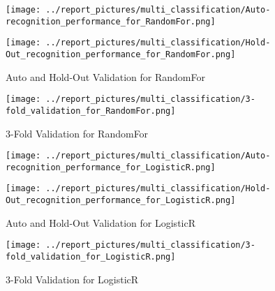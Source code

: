         \begin{figure}[H]
            \begin{minipage}[c]{.46\linewidth}
                  \texttt{[image: ../report\_pictures/multi\_classification/Auto-recognition\_performance\_for\_RandomFor.png]}
            \end{minipage} \hfill
            \begin{minipage}[c]{.46\linewidth}
                \texttt{[image: ../report\_pictures/multi\_classification/Hold-Out\_recognition\_performance\_for\_RandomFor.png]}
            \end{minipage}
            \caption{Auto and Hold-Out Validation for RandomFor}
            \label{CV_RandomFor}
        \end{figure}   
   
        \begin{figure}[H]
            \texttt{[image: ../report\_pictures/multi\_classification/3-fold\_validation\_for\_RandomFor.png]}
        \caption{3-Fold Validation for RandomFor}
        \label{3Fold_RandomFor}
        \end{figure} 
        
        \begin{figure}[H]
            \begin{minipage}[c]{.46\linewidth}
                  \texttt{[image: ../report\_pictures/multi\_classification/Auto-recognition\_performance\_for\_LogisticR.png]}
            \end{minipage} \hfill
            \begin{minipage}[c]{.46\linewidth}
                \texttt{[image: ../report\_pictures/multi\_classification/Hold-Out\_recognition\_performance\_for\_LogisticR.png]}
            \end{minipage}
            \caption{Auto and Hold-Out Validation for LogisticR}
            \label{CV_LogisticR}
        \end{figure}   
   
        \begin{figure}[H]
            \texttt{[image: ../report\_pictures/multi\_classification/3-fold\_validation\_for\_LogisticR.png]}
        \caption{3-Fold Validation for LogisticR}
        \label{3Fold_LogisticR}
        \end{figure} 
        